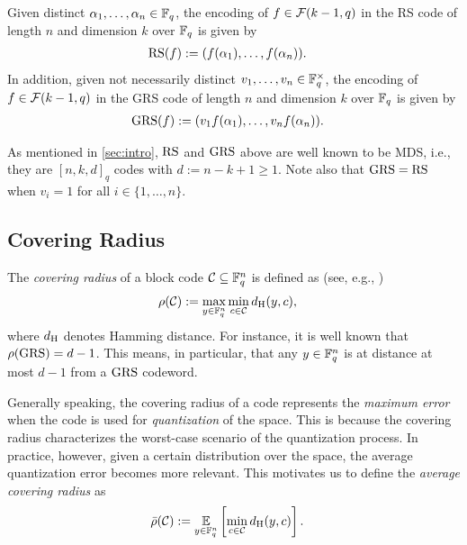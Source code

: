 \documentclass[conference]{IEEEtran}
\begin{document}
Given distinct $\alpha_{1}, \dots, \alpha_{n} \in {\mathbb F}_{q}$, the encoding of $f \in {\mathcal F}(k - 1, q)$ 
in the RS code of length $n$ and dimension $k$ over ${\mathbb F}_{q}$ is given by
\begin{align}
    \label{eq:rs}
    \operatorname{RS}(f) 
    &:= (f(\alpha_{1}), \dots, f(\alpha_{n})). 
\end{align}
In addition, given not necessarily distinct 
$v_{1}, \dots, v_{n} \in {\mathbb F}_{q}^{\times}$, the encoding of $f \in {\mathcal F}(k - 1, q)$ in the GRS code of length $n$ and dimension $k$ over ${\mathbb F}_{q}$ is given by
\begin{align}
    \label{eq:grs}
    \operatorname{GRS}(f) 
    &:= (v_{1} f(\alpha_{1}), \dots, v_{n} f(\alpha_{n})).
\end{align}

As mentioned in \autoref{sec:intro}, $\operatorname{RS}$ and $\operatorname{GRS}$ above are well known to be MDS, i.e., they are $[n, k, d]_{q}$ codes 
with $d := n - k + 1 \ge 1$. 
Note also that $\operatorname{GRS} = \operatorname{RS}$ when $v_{i} = 1$ for all $i \in \{1, \dots, n\}$. 

\subsection{Covering Radius}

The \emph{covering radius} of a block code ${\mathcal C} \subseteq {\mathbb F}_{q}^{n}$ is defined as (see, e.g., \cite{Huffman03})
\begin{align}
    \label{eq:rho}
    \rho({\mathcal C}) 
    &:= \max_{y \in {\mathbb F}_{q}^{n}} 
    \min_{c \in {\mathcal C}} 
    d_{{\rm H}}(y, c), 
\end{align}
where $d_{{\rm H}}$ denotes Hamming distance. 
For instance, it is well known that $\rho(\operatorname{GRS}) = d - 1$. 
This means, in particular, that any $y \in {\mathbb F}_{q}^{n}$ is at distance at most $d - 1$ from a $\operatorname{GRS}$ codeword. 

Generally speaking, the covering radius of a code represents the \textit{maximum error} when the code is used for \emph{quantization} of the space. This is because the covering radius characterizes the worst-case scenario of the quantization process. In practice, however, given a certain distribution over the space, the average quantization error becomes more relevant. This motivates us to define the \emph{average covering radius} as 
\begin{align}
    \label{eq:rhobar}
    \bar\rho({\mathcal C}) 
    &:= \operatorname*{\mathbb{E}}_{y \in {\mathbb F}_{q}^{n}} 
    \left[\min_{c \in {\mathcal C}} 
    d_{{\rm H}}(y, c)\right]. 
\end{align}
\end{document}
